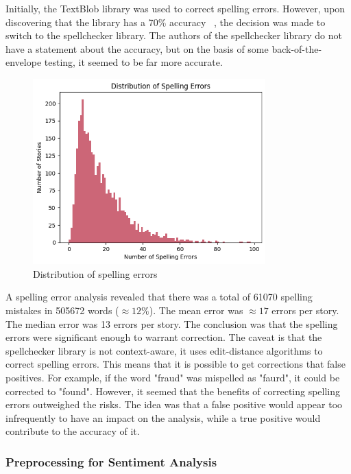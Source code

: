 Initially, the TextBlob library was used to correct spelling errors. However, upon discovering that the library has a 70\% accuracy ~\cite{loria2018textblob}, the decision was made to switch to the spellchecker library. The authors of the spellchecker library do not have a statement about the accuracy, but on the basis of some back-of-the-envelope testing, it seemed to be far more accurate.

\begin{figure}[h]
    \centering
    \includegraphics[width=0.8\textwidth]{resources/spelling_mistakes_distribution.png}
    \caption{Distribution of spelling errors}
    \label{fig:spelling_error_distribution}
\end{figure}


A spelling error analysis revealed that there was a total of 61070 spelling mistakes in 505672 words ($\approx 12\%$). The mean error was $\approx17$ errors per story. The median error was 13 errors per story. The conclusion was that the spelling errors were significant enough to warrant correction. The caveat is that the spellchecker library is not context-aware, it uses edit-distance algorithms to correct spelling errors. This means that it is possible to get corrections that false positives. For example, if the word "fraud" was mispelled as "faurd", it could be corrected to "found". However, it seemed that the benefits of correcting spelling errors outweighed the risks. The idea was that a false positive would appear too infrequently to have an impact on the analysis, while a true positive would contribute to the accuracy of it.

\subsubsection*{Preprocessing for Sentiment Analysis}

